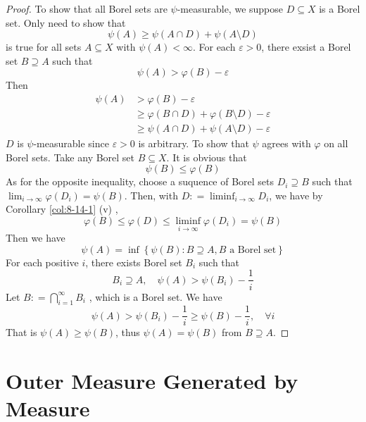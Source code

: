 \documentclass[../main.tex]{subfiles}
\begin{document}
\begin{proof}
    To show that all Borel sets are \(  \psi   \)-measurable, we suppose \(  D\subseteq X  \) is a Borel set. Only need to show that \[
    \psi \left( A \right)\ge \psi \left( A\cap D \right)+ \psi \left( A\setminus D \right)   
    \] is true for all sets \(  A\subseteq X  \) with \(  \psi \left( A \right)< \infty   \). For each \(   \varepsilon > 0  \), there exsist a Borel set \(  B\supseteq A  \) such that \[
    \psi \left( A \right)>  \varphi \left( B \right)- \varepsilon   
    \]      Then \[
    \begin{aligned}
    \psi \left( A \right)&>  \varphi  \left( B \right)- \varepsilon \\ 
     &\ge   \varphi \left( B\cap D \right)+  \varphi \left( B\setminus D \right)- \varepsilon \\ 
      &\ge    \psi \left( A\cap D \right)+ \psi \left( A\setminus D \right)- \varepsilon    
    \end{aligned}
    \] \(  D  \) is \(  \psi   \)-measurable since \(   \varepsilon > 0  \) is arbitrary. To show that \(  \psi   \) agrees with \(   \varphi   \) on all Borel sets. Take any Borel set \( B\subseteq X  \). It is obvious that \[
    \psi \left( B\right)\le  \varphi \left( B \right)  
    \]   As for the opposite inequality, choose a suquence of Borel sets  \(  D_{i}\supseteq B\) such that \(  \lim_{i\to \infty} \varphi \left( D_{i} \right)= \psi \left( B \right)    \).  Then, with \(  D: = \liminf_{i\to \infty}D_{i}  \), we have by  Corollary \ref{col:8-14-1} (v) , \[
     \varphi \left( B \right)\le   \varphi \left( D \right)\le \liminf_{i\to \infty} \varphi \left( D_{i} \right)= \psi \left( B \right)   
    \]Then we have \[
    \psi \left( A \right)= \inf \left\{ \psi \left( B \right):B\supseteq A, B\text{ a Borel set}  \right\} 
    \]For each positive \(  i  \), there exists Borel set \(  B_{i}  \) such that \[
    B_{i}\supseteq A,\quad \psi \left( A \right)> \psi \left( B _{i}\right)-\frac{1 }{i }   
    \]  Let \(  B: = \bigcap_{i= 1}^{\infty}B_{i}   \) , which is a Borel set. We have \[
    \psi \left( A \right)> \psi \left( B_{i} \right)-\frac{1 }{i }\ge \psi \left( B \right)-\frac{1 }{i },\quad \forall i     
    \] That is \(  \psi \left( A \right)\ge \psi \left( B \right)    \), thus \(  \psi \left( A \right)= \psi \left( B \right)    \) from \(  B\supseteq A  \).   
\end{proof}

\section{Outer Measure Generated by Measure}
\end{document}
